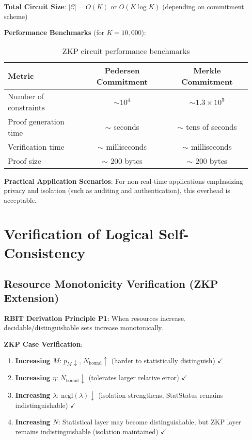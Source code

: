 \documentclass[12pt]{article}
\theoremstyle{plain}
\theoremstyle{definition}
\begin{document}
\textbf{Total Circuit Size}: $|\mathcal{C}| = O(K)$ or $O(K \log K)$ (depending on commitment scheme)

\textbf{Performance Benchmarks} (for $K=10,000$):

\begin{table}[h]
\centering
\caption{ZKP circuit performance benchmarks}
\begin{tabular}{@{}lcc@{}}
\toprule
Metric & Pedersen Commitment & Merkle Commitment \\
\midrule
Number of constraints & $\sim 10^4$ & $\sim 1.3 \times 10^5$ \\
Proof generation time & $\sim$ seconds & $\sim$ tens of seconds \\
Verification time & $\sim$ milliseconds & $\sim$ milliseconds \\
Proof size & $\sim$ 200 bytes & $\sim$ 200 bytes \\
\bottomrule
\end{tabular}
\end{table}

\textbf{Practical Application Scenarios}: For non-real-time applications emphasizing privacy and isolation (such as auditing and authentication), this overhead is acceptable.

\section{Verification of Logical Self-Consistency}

\subsection{Resource Monotonicity Verification (ZKP Extension)}

\textbf{RBIT Derivation Principle P1}: When resources increase, decidable/distinguishable sets increase monotonically.

\textbf{ZKP Case Verification}:

\begin{enumerate}
\item \textbf{Increasing $M$}: $p_M \downarrow$, $N_{\text{bound}} \uparrow$ (harder to statistically distinguish) $\checkmark$
\item \textbf{Increasing $\eta$}: $N_{\text{bound}} \downarrow$ (tolerates larger relative error) $\checkmark$
\item \textbf{Increasing $\lambda$}: $\text{negl}(\lambda) \downarrow$ (isolation strengthens, StatStatus remains indistinguishable) $\checkmark$
\item \textbf{Increasing $N$}: Statistical layer may become distinguishable, but ZKP layer remains indistinguishable (isolation maintained) $\checkmark$
\end{enumerate}
\end{document}
